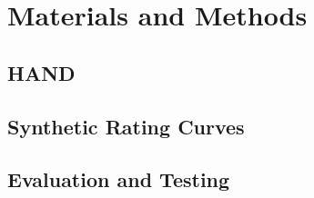 \section{Materials and Methods}

\subsection{HAND}

\subsection{Synthetic Rating Curves}

\subsection{Evaluation and Testing}

